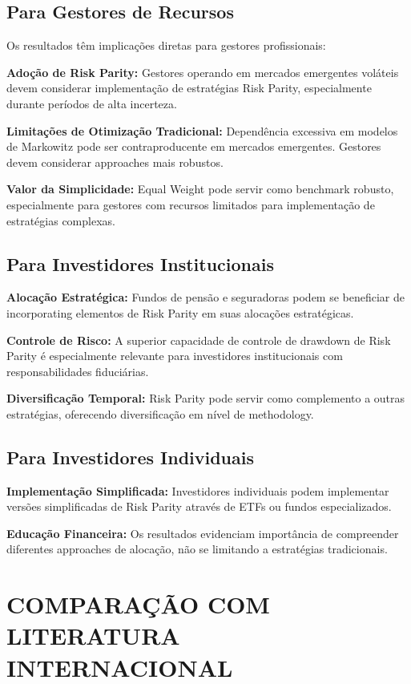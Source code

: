 \subsection{Para Gestores de Recursos}

Os resultados têm implicações diretas para gestores profissionais:

\textbf{Adoção de Risk Parity:} Gestores operando em mercados emergentes voláteis devem considerar implementação de estratégias Risk Parity, especialmente durante períodos de alta incerteza.

\textbf{Limitações de Otimização Tradicional:} Dependência excessiva em modelos de Markowitz pode ser contraproducente em mercados emergentes. Gestores devem considerar approaches mais robustos.

\textbf{Valor da Simplicidade:} Equal Weight pode servir como benchmark robusto, especialmente para gestores com recursos limitados para implementação de estratégias complexas.

\subsection{Para Investidores Institucionais}

\textbf{Alocação Estratégica:} Fundos de pensão e seguradoras podem se beneficiar de incorporating elementos de Risk Parity em suas alocações estratégicas.

\textbf{Controle de Risco:} A superior capacidade de controle de drawdown de Risk Parity é especialmente relevante para investidores institucionais com responsabilidades fiduciárias.

\textbf{Diversificação Temporal:} Risk Parity pode servir como complemento a outras estratégias, oferecendo diversificação em nível de methodology.

\subsection{Para Investidores Individuais}

\textbf{Implementação Simplificada:} Investidores individuais podem implementar versões simplificadas de Risk Parity através de ETFs ou fundos especializados.

\textbf{Educação Financeira:} Os resultados evidenciam importância de compreender diferentes approaches de alocação, não se limitando a estratégias tradicionais.

\section{COMPARAÇÃO COM LITERATURA INTERNACIONAL}

